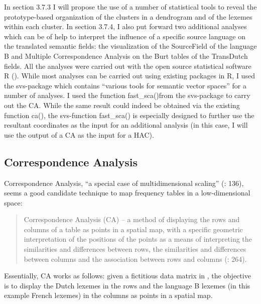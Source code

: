 In section 3.7.3 I will propose the use of a number of statistical tools to reveal the prototype-based organization of the clusters in a dendrogram and of the lexemes within each cluster. In section 3.7.4, I also put forward two additional analyses which can be of help to interpret the influence of a specific source language on the translated semantic fields: the visualization of the SourceField of the language B and Multiple Correspondence Analysis on the Burt tables of the TransDutch fields. All the analyses were carried out with the open source statistical software R (\citealt{r_core_r:_2014}). While most analyses can be carried out using existing packages in R, I used the svs{}-package \citep{plevoets_svs:_2015} which contains “various tools for semantic vector spaces” for a number of analyses. I used the function fast\_sca()from the svs{}-package to carry out the CA. While the same result could indeed be obtained via the existing function ca(), the svs{}-function fast\_sca() is especially designed to further use the resultant coordinates as the input for an additional analysis (in this case, I will use the output of a CA as the input for a HAC).


\subsection{\label{sec:3.7.1}  Correspondence Analysis}

Correspondence Analysis, “a special case of multidimensional scaling” (\citealt{baayen_analyzing_2008}: 136), seems a good candidate technique to map frequency tables in a low-dimensional space:


\begin{quote}
Correspondence Analysis (CA) – a method of displaying the rows and columns of a table as points in a spatial map, with a specific geometric interpretation of the positions of the points as a means of interpreting the similarities and differences between rows, the similarities and differences between columns and the association between rows and columns (\citealt{greenacre_correspondence_2007}: 264).
\end{quote}


Essentially, CA works as follows: given a fictitious data matrix in , the objective is to display the Dutch lexemes in the rows and the language B lexemes (in this example French lexemes) in the columns as points in a spatial map.



